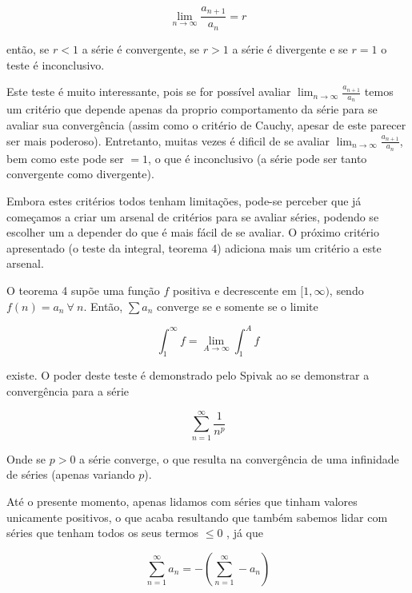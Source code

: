 \documentclass[a4paper, 12pt]{article}
\begin{document}
\begin{equation}
 \nonumber \lim_{n\to\infty} \frac{a_{n+1}}{a_n} = r
\end{equation}

então, se $r < 1$ a série é convergente, se $r>1$ a série é divergente e se $r=1$ o teste
é inconclusivo.

Este teste é muito interessante, pois se for possível avaliar $ \lim_{n\to\infty} \frac{a_{n+1}}{a_n} $
temos um critério que depende apenas da proprio comportamento da série para se avaliar sua 
convergência (assim como o critério de Cauchy, apesar de este parecer ser mais poderoso). Entretanto, muitas vezes é dificil de se avaliar $ \lim_{n\to\infty} \frac{a_{n+1}}{a_n} $,
bem como este pode ser $=1$, o que é inconclusivo (a série pode ser tanto convergente como divergente).

Embora estes critérios todos tenham limitações, pode-se perceber que já começamos a criar um
arsenal de critérios para se avaliar séries, podendo se escolher um a depender do que é mais fácil de se
avaliar. O próximo critério apresentado (o teste da integral, teorema 4) adiciona mais um 
critério a este arsenal.

O teorema 4 supõe uma função $f$ positiva e decrescente em $[1,\infty)$, sendo $f(n) = a_n \ \forall \ n$.
Então, $\sum a_n$ converge se e somente se o limite

\begin{equation}
 \nonumber \int_1^{\infty} f = \lim_{A \to \infty}\int_{1}^A f
\end{equation}

existe. O poder deste teste é demonstrado pelo Spivak ao se demonstrar a convergência para a série

\begin{equation}
 \nonumber \sum_{n=1}^{\infty} \frac{1}{n^p}
\end{equation}

Onde se $p>0$ a série converge, o que resulta na convergência de uma infinidade de séries 
(apenas variando $p$).

Até o presente momento, apenas lidamos com séries que tinham valores unicamente positivos,
o que acaba resultando que também sabemos lidar com séries que tenham todos os seus termos $\leq 0$
, já que

\begin{equation}
 \nonumber \sum_{n=1}^{\infty} a_n = -(\sum_{n=1}^{\infty} - a_n )
\end{equation}
\end{document}
